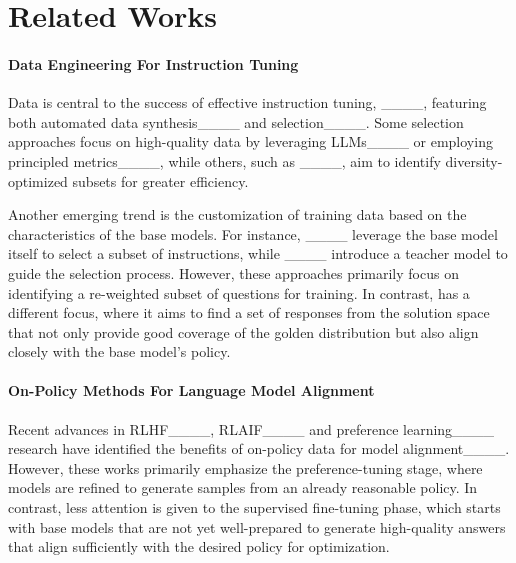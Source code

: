 \section{Related Works}
\paragraph{Data Engineering For Instruction Tuning}

Data is central to the success of effective instruction tuning, ____, featuring both automated data synthesis____ and selection____. Some selection approaches focus on high-quality data by leveraging LLMs____ or employing principled metrics____, while others, such as ____, aim to identify diversity-optimized subsets for greater efficiency.

Another emerging trend is the customization of training data based on the characteristics of the base models. For instance, ____ leverage the base model itself to select a subset of instructions, while ____ introduce a teacher model to guide the selection process. However, these approaches primarily focus on identifying a re-weighted subset of questions for training. In contrast, \name has a different focus, where it aims to find a set of responses from the solution space that not only provide good coverage of the golden distribution but also align closely with the base model's policy.

\paragraph{On-Policy Methods For Language Model Alignment}

Recent advances in RLHF____, RLAIF____ and preference learning____ research have identified the benefits of on-policy data for model alignment____. However, these works primarily emphasize the preference-tuning stage, where models are refined to generate samples from an already reasonable policy. In contrast, less attention is given to the supervised fine-tuning phase, which starts with base models that are not yet well-prepared to generate high-quality answers that align sufficiently with the desired policy for optimization.


